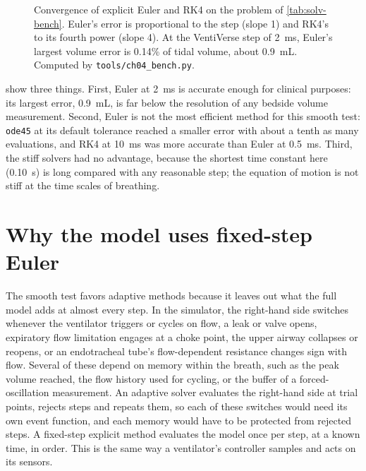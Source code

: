 \begin{figure}[ht]
\centering

\caption{Convergence of explicit Euler and RK4 on the problem of \cref{tab:solv-bench}. Euler's error is proportional to the step (slope 1) and RK4's to its fourth power (slope 4). At the VentiVerse step of \SI{2}{\milli\second}, Euler's largest volume error is 0.14\% of tidal volume, about \SI{0.9}{\milli\liter}. Computed by \texttt{tools/ch04\_bench.py}.}
\label{fig:solv-conv}
\end{figure}

 show three things. First, Euler at \SI{2}{\milli\second} is accurate enough for clinical purposes: its largest error, \SI{0.9}{\milli\liter}, is far below the resolution of any bedside volume measurement. Second, Euler is not the most efficient method for this smooth test: \texttt{ode45} at its default tolerance reached a smaller error with about a tenth as many evaluations, and RK4 at \SI{10}{\milli\second} was more accurate than Euler at \SI{0.5}{\milli\second}. Third, the stiff solvers had no advantage, because the shortest time constant here (\SI{0.10}{\second}) is long compared with any reasonable step; the equation of motion is not stiff at the time scales of breathing.

\section{Why the model uses fixed-step Euler}
\label{sec:solv-why}
The smooth test favors adaptive methods because it leaves out what the full model adds at almost every step. In the simulator, the right-hand side switches whenever the ventilator triggers or cycles on flow, a leak or valve opens, expiratory flow limitation engages at a choke point, the upper airway collapses or reopens, or an endotracheal tube's flow-dependent resistance changes sign with flow. Several of these depend on memory within the breath, such as the peak volume reached, the flow history used for cycling, or the buffer of a forced-oscillation measurement. An adaptive solver evaluates the right-hand side at trial points, rejects steps and repeats them, so each of these switches would need its own event function, and each memory would have to be protected from rejected steps. A fixed-step explicit method evaluates the model once per step, at a known time, in order. This is the same way a ventilator's controller samples and acts on its sensors.

